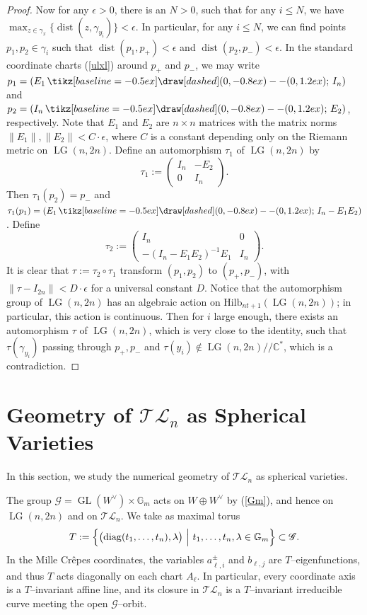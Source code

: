 \documentclass[10pt]{amsart}
\theoremstyle{definition}
\newcommand{\LG}{\operatorname{LG}}
\newcommand{\TL}{\mathcal{TL}}
\newcommand{\GL}{\operatorname{GL}}
\newcommand{\Gm}{\mathbb{G}_m}
\theoremstyle{plain} %
\newcommand{\vdashline}{\tikz[baseline=-0.5ex]\draw[dashed] (0,-0.8ex) -- (0,1.2ex);}
\begin{document}
\begin{proof}
Now for any $\epsilon>0$, there is an $N>0$, such that for any $i\leq N$,
we have $\max_{z\in\gamma_{x}}\{\operatorname{dist}(z,\gamma_{y_i})\}<\epsilon$. In particular, for any $i\leq N$, we can find points $p_1,p_2\in\gamma_i$ such that $\operatorname{dist}(p_1,p_+)<\epsilon$ and $\operatorname{dist}(p_2,p_-)<\epsilon$.
In the standard coordinate charts (\ref{ulxl}) around $p_+$ and $p_-$, we may write $p_1=(E_1\,\vdashline\,I_{n})$ and 
$p_2=(I_{n}\,\vdashline\,E_2)$,
respectively. Note that $E_1$ and $E_2$ are $n\times n$ matrices with the matrix norms $\|E_1\|,\|E_2\|<C\cdot \epsilon$, where $C$ is a constant depending only on the Riemann metric on $\LG(n,2n)$. Define an automorphism $\tau_1$ of $\LG(n,2n)$ by
\begin{equation*}
\tau_1:=\begin{pmatrix}
        I_n&-E_2\\
        0&I_n
    \end{pmatrix}.
\end{equation*}
Then $\tau_1(p_2)=p_-$ and $\tau_1(p_1)=\left(E_1\,\vdashline\,I_n-E_1E_2\right)$. Define
\begin{equation*}
\tau_2:=\begin{pmatrix}
        I_n&0\\
        -(I_n-E_1E_2)^{-1}E_1&I_n
    \end{pmatrix}.
\end{equation*}
It is clear that $\tau:=\tau_2\circ\tau_1$
transform $(p_1,p_2)$ to $(p_+,p_-)$, with $\|\tau-I_{2n}\|<D\cdot\epsilon$ for a universal constant $D$. Notice that the automorphism group of $\LG(n,2n)$ has an algebraic action on $\mathrm{Hilb}_{nt+1}(\LG(n,2n))$; in particular, this action is continuous. Then for $i$ large enough, there exists an automorphism $\tau$ of $\LG(n,2n)$, which is very close to the identity, such that $\tau(\gamma_{y_i})$ passing through $p_+,p_-$ and $\tau(y_i)\notin\LG(n,2n)\! /\!/\mathbb C^*$, which is a contradiction.
\end{proof}





\section{Geometry of \texorpdfstring{$\TL_n$}{TL\_n} as Spherical Varieties}\label{Sec2/2}

In this section, we study the numerical geometry of $\TL_n$ as spherical varieties.

The group
$\mathscr G=\GL(W^\vee)\times\Gm$
acts on $W\oplus W^\vee$ by (\ref{Gm}),
and hence on $\LG(n,2n)$ and on $\TL_n$.
We take as maximal torus
\begin{equation}\label{MaxTor}
T:=\Bigl\{\bigl(\mathrm{diag}(t_1,\dots,t_n),\lambda\bigr)
\ \Big|\ t_1,\dots,t_n,\lambda\in\Gm\Bigr\}\subset\mathscr G.
\end{equation}
In the Mille Cr\^epes coordinates, the variables  $a_{\ell,i}^\pm$ and
$b_{\ell,j}$ are $T$--eigenfunctions, and thus $T$ acts diagonally on each
chart $A_\ell$.
In particular, every coordinate axis is a $T$--invariant affine line, and
its closure in $\TL_n$ is a $T$–invariant irreducible curve meeting the
open $\mathscr G$--orbit.
\end{document}

